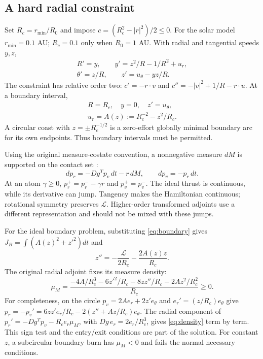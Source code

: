\subsection{A hard radial constraint}
Set $R_c=r_{\min}/R_0$ and impose
$c=(R_c^2-|r|^2)/2\le0$. For the solar model
$r_{\min}=0.1$ AU; $R_c=0.1$ only when $R_0=1$ AU.
With radial and tangential speeds $y,z$,
\begin{equation}
 \begin{gathered}
 R'=y,\qquad
 y'=z^2/R-1/R^2+u_r,\\
 \theta'=z/R,\qquad z'=u_\theta-yz/R.
 \end{gathered}
\end{equation}
The constraint has relative order two:
$c'=-r\cdot v$ and
$c''=-|v|^2+1/R-r\cdot u$.
At a boundary interval,
\begin{equation}
 \begin{gathered}
 R=R_c,\quad y=0,\quad z'=u_\theta,\\
 u_r=A(z):=R_c^{-2}-z^2/R_c.
 \end{gathered}
 \label{eq:boundary}
\end{equation}
A circular coast with $z=\pm R_c^{-1/2}$ is a zero-effort globally
minimal boundary arc for its own endpoints. Thus boundary intervals
must be permitted.

Using the original measure-costate convention, a nonnegative measure
$dM$ is supported on the contact set \cite{HartlSethiVickson1995,BonnansHermant2009}:
\begin{equation}
 dp_r=-Dg^Tp_v\,dt-r\,dM,\qquad dp_v=-p_r\,dt.
\end{equation}
At an atom $\gamma\ge0$,
$p_r^+=p_r^--\gamma r$ and $p_v^+=p_v^-$.
The ideal thrust is continuous, while its derivative can jump.
Tangency makes the Hamiltonian continuous; rotational symmetry
preserves $\mathcal L$. Higher-order transformed adjoints use a
different representation and should not be mixed with these jumps.

For the ideal boundary problem, substituting \eqref{eq:boundary}
gives $J_B=\int(A(z)^2+z'^2)dt$ and
\begin{equation}
 z''=-\frac{\mathcal L}{2R_c}-\frac{2A(z)z}{R_c}.
\end{equation}
The original radial adjoint fixes its measure density:
\begin{equation}
 \mu_M=
 \frac{-4A/R_c^3-6z'^2/R_c-8zz''/R_c-2Az^2/R_c^2}{R_c}
 \ge0.
 \label{eq:density}
\end{equation}
For completeness, on the circle
$p_v=2Ae_r+2z'e_\theta$ and $e_r'=(z/R_c)e_\theta$ give
$p_r=-p_v'=6zz'e_r/R_c-2(z''+Az/R_c)e_\theta$.
The radial component of $p_r'=-Dg^Tp_v-R_ce_r\mu_M$, with
$Dg\,e_r=2e_r/R_c^3$, gives \eqref{eq:density} term by term.
This sign test and the entry/exit conditions are part of the solution.
For constant $z$, a subcircular boundary burn has $\mu_M<0$ and
fails the normal necessary conditions.


